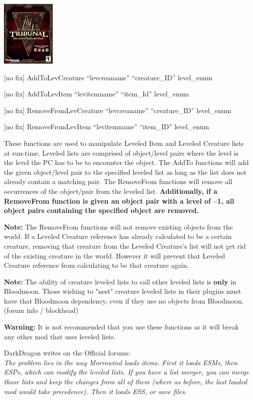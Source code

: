 \documentclass[
]{article}
\begin{document}
\includegraphics{media/image6.png}

{[}no fix{]} AddToLevCreature ``levcreaname'' ``creature\_ID''
level\_enum

{[}no fix{]} AddToLevItem ``levitemname'' ``item\_Id'' level\_enum

{[}no fix{]} RemoveFromLevCreature ``levcreaname'' ``creature\_ID''
level\_enum

{[}no fix{]} RemoveFromLevItem ``levitemname'' ``item\_ID'' level\_enum

These functions are used to manipulate Leveled Item and Leveled Creature
lists at run-time. Leveled lists are comprised of object/level pairs
where the level is the level the PC has to be to encounter the object.
The AddTo functions will add the given object/level pair to the
specified leveled list as long as the list does not already contain a
matching pair. The RemoveFrom functions will remove all occurrences of
the object/pair from the leveled list. \textbf{Additionally, if a
RemoveFrom function is given an object pair with a level of --1, all
object pairs containing the specified object are removed.}

\textbf{Note:} The RemoveFrom functions will not remove existing objects
from the world. If a Leveled Creature reference has already calculated
to be a certain creature, removing that creature from the Leveled
Creature's list will not get rid of the existing creature in the world.
However it will prevent that Leveled Creature reference from calculating
to be that creature again.

\textbf{Note:} The ability of creature leveled lists to call other
leveled lists is \textbf{only} in Bloodmoon. Those wishing to "nest"
creature leveled lists in their plugins must have that Bloodmoon
dependency, even if they use no objects from Bloodmoon. (forum info /
blockhead)

\textbf{Warning:} It is not recommended that you use these functions as
it will break any other mod that uses leveled lists.

DarkDragon writes on the Official forums:\\
\emph{The problem lies in the way Morrowind loads items. First it loads
ESMs, then ESPs, which can modify the leveled lists. If you have a list
merger, you can merge those lists and keep the changes from all of them
(where as before, the last loaded mod would take precedence). Then it
loads ESS, or save files.}
\end{document}
